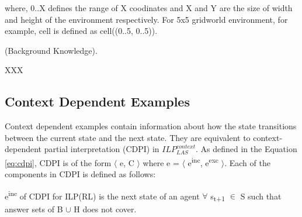 where, 0..X defines the range of X coodinates and X and Y are the size of width and height of the environment respectively. 
For 5x5 gridworld environment, for example, cell is defined as cell((0..5, 0..5)).



\begin{examp} \normalfont (Background Knowledge).

XXX
\end{examp}


\subsection{Context Dependent Examples}
Context dependent examples contain information about how the state transitions between the current state and the next state.
They are equivalent to context-dependent partial interpretation (CDPI) in  $ILP_{LAS}^{context}$. 
As defined in the Equation \ref{eq:cdpi}, CDPI is of the form $\langle$ e, C $\rangle$ where e = $\langle$ e\textsuperscript{inc}, e\textsuperscript{exc} $\rangle$. 
Each of the components in CDPI is defined as follows:
\begin{defn}
e\textsuperscript{inc} of CDPI for ILP(RL) is the next state of an agent $\forall$ s\textsubscript{t+1} $\in$ S such that answer sets of B $\cup$ H does not cover.
\end{defn}


